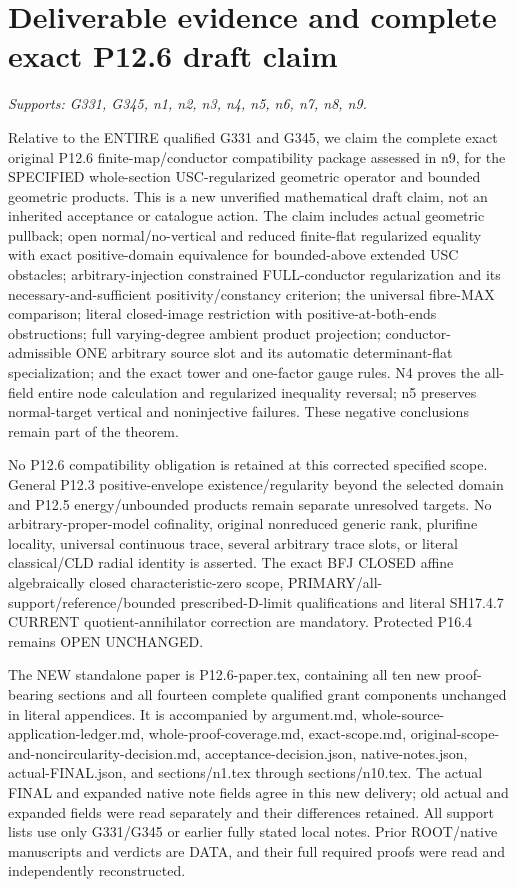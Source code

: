 \documentclass[11pt]{article}
\begin{document}
\section{Deliverable evidence and complete exact P12.6 draft claim}
\textit{Supports: G331, G345, n1, n2, n3, n4, n5, n6, n7, n8, n9.}

Relative to the ENTIRE qualified G331 and G345, we claim the complete exact original P12.6 finite-map/conductor compatibility package assessed in n9, for the SPECIFIED whole-section USC-regularized geometric operator and bounded geometric products. This is a new unverified mathematical draft claim, not an inherited acceptance or catalogue action. The claim includes actual geometric pullback; open normal/no-vertical and reduced finite-flat regularized equality with exact positive-domain equivalence for bounded-above extended USC obstacles; arbitrary-injection constrained FULL-conductor regularization and its necessary-and-sufficient positivity/constancy criterion; the universal fibre-MAX comparison; literal closed-image restriction with positive-at-both-ends obstructions; full varying-degree ambient product projection; conductor-admissible ONE arbitrary source slot and its automatic determinant-flat specialization; and the exact tower and one-factor gauge rules. N4 proves the all-field entire node calculation and regularized inequality reversal; n5 preserves normal-target vertical and noninjective failures. These negative conclusions remain part of the theorem.

No P12.6 compatibility obligation is retained at this corrected specified scope. General P12.3 positive-envelope existence/regularity beyond the selected domain and P12.5 energy/unbounded products remain separate unresolved targets. No arbitrary-proper-model cofinality, original nonreduced generic rank, plurifine locality, universal continuous trace, several arbitrary trace slots, or literal classical/CLD radial identity is asserted. The exact BFJ CLOSED affine algebraically closed characteristic-zero scope, PRIMARY/all-support/reference/bounded prescribed-D-limit qualifications and literal SH17.4.7 CURRENT quotient-annihilator correction are mandatory. Protected P16.4 remains OPEN UNCHANGED.

The NEW standalone paper is P12.6-paper.tex, containing all ten new proof-bearing sections and all fourteen complete qualified grant components unchanged in literal appendices. It is accompanied by argument.md, whole-source-application-ledger.md, whole-proof-coverage.md, exact-scope.md, original-scope-and-noncircularity-decision.md, acceptance-decision.json, native-notes.json, actual-FINAL.json, and sections/n1.tex through sections/n10.tex. The actual FINAL and expanded native note fields agree in this new delivery; old actual and expanded fields were read separately and their differences retained. All support lists use only G331/G345 or earlier fully stated local notes. Prior ROOT/native manuscripts and verdicts are DATA, and their full required proofs were read and independently reconstructed.
\end{document}
